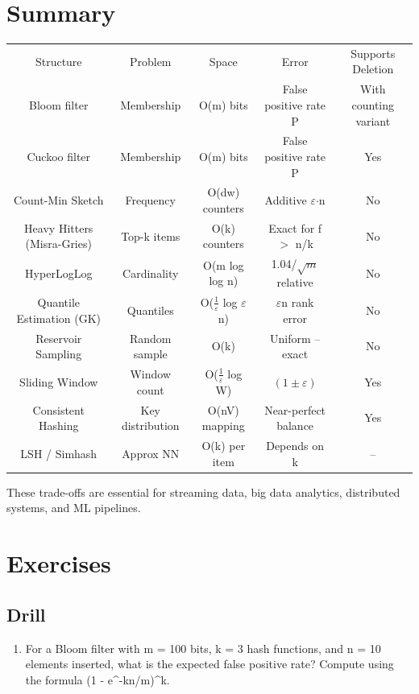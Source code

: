 \section{Summary}

\begin{center}
\begin{tabular}{ccccc}
\toprule
Structure & Problem & Space & Error & Supports Deletion \\
Bloom filter & Membership & O(m) bits & False positive rate P & With counting variant \\
Cuckoo filter & Membership & O(m) bits & False positive rate P & Yes \\
Count-Min Sketch & Frequency & O(dw) counters & Additive $\varepsilon $$\cdot $n & No \\
Heavy Hitters (Misra-Gries) & Top-k items & O(k) counters & Exact for f $>$ n/k & No \\
HyperLogLog & Cardinality & O(m log log n) & 1.04/$\sqrt {m}$ relative & No \\
Quantile Estimation (GK) & Quantiles & O($\frac{1}{\varepsilon}$ log $\varepsilon $n) & $\varepsilon $n rank error & No \\
Reservoir Sampling & Random sample & O(k) & Uniform -- exact & No \\
Sliding Window & Window count & O($\frac{1}{\varepsilon}$ log W) & $(1 \pm \varepsilon)$ & Yes \\
Consistent Hashing & Key distribution & O(nV) mapping & Near-perfect balance & Yes \\
LSH / Simhash & Approx NN & O(k) per item & Depends on k & -- \\

\bottomrule
\end{tabular}
\end{center}
These trade-offs are essential for streaming data, big data analytics, distributed systems, and ML pipelines.

\section{Exercises}

\subsection{Drill}

\begin{enumerate}
\item For a Bloom filter with m = 100 bits, k = 3 hash functions, and n = 10 elements inserted, what is the expected false positive rate? Compute using the formula (1 - e\textasciicircum{}{-kn/m})\textasciicircum{}k.
\end{enumerate}

